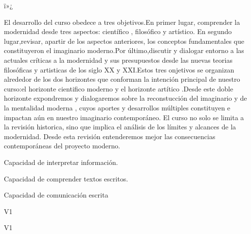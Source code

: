ï»¿\begin{syllabus}


\begin{justification}
El desarrollo del curso obedece a tres objetivos.En primer lugar, comprender la modernidad desde tres aspectos: científico , filosófico y artístico.
En segundo lugar,revisar, apartir de los aspectos anteriores, los conceptos fundamentales que constituyeron el imaginario moderno.Por último,discutir y 
dialogar entorno a las actuales críticas a la modernidad y sus presupuestos desde las nuevas teorias filosóficas y artisticas de los siglo XX y XXI.Estos
tres onjetivos se organizan alrededor de los dos horizontes que conforman la intención principal de nuestro curso:el horizonte cientifico moderno y el horizonte
artítico .Desde este doble horizonte expondremos y dialogaremos sobre la reconstucción del imaginario y de la mentalidad moderna , cuyos aportes y desarrollos 
múltiples constituyen e impactan aún en nuestro imaginario contemporáneo. El curso no solo se limita a la revisión historica, sino que implica el análisis de los
límites y alcances de la modernidad. Desde esta revisión entenderemos mejor las consecuencias contemporáneas del proyecto moderno.

\end{justification}

\begin{goals}
\item Capacidad de interpretar información.
\item Capacidad de comprender textos escritos.
\item Capacidad de comunicación escrita
\end{goals}

\begin{outcomes}{V1}
    \item {} %
    \item {} %
    \item {} %
    \item {} %
\end{outcomes}

\begin{competences}{V1}
    \item {}
    \item {}
    \item {}
    \item {}
\end{competences}


\end{syllabus}
